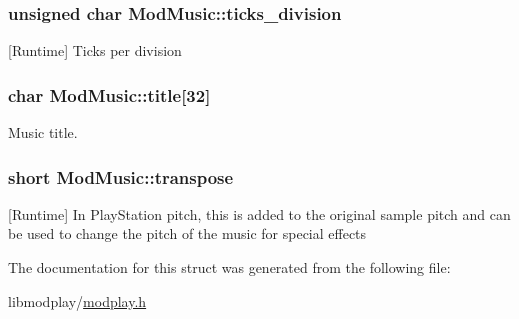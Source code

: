 \hypertarget{structModMusic_afa6eab79cc47740d4f146e2adfc16c9c}{}
\subsubsection[{ticks\+\_\+division}]{\setlength{\rightskip}{0pt plus 5cm}unsigned char Mod\+Music\+::ticks\+\_\+division}\label{structModMusic_afa6eab79cc47740d4f146e2adfc16c9c}


\mbox{[}Runtime\mbox{]} Ticks per division 

\hypertarget{structModMusic_a7b9e83bdae925b85b8603f9f92cc22f6}{}
\subsubsection[{title}]{\setlength{\rightskip}{0pt plus 5cm}char Mod\+Music\+::title\mbox{[}32\mbox{]}}\label{structModMusic_a7b9e83bdae925b85b8603f9f92cc22f6}


Music title. 

\hypertarget{structModMusic_a08eaea3acf218f237d5cfcb05870d7fc}{}
\subsubsection[{transpose}]{\setlength{\rightskip}{0pt plus 5cm}short Mod\+Music\+::transpose}\label{structModMusic_a08eaea3acf218f237d5cfcb05870d7fc}


\mbox{[}Runtime\mbox{]} In Play\+Station pitch, this is added to the original sample pitch and can be used to change the pitch of the music for special effects 



The documentation for this struct was generated from the following file\+:\begin{DoxyCompactItemize}
\item 
libmodplay/\hyperlink{modplay_8h}{modplay.\+h}\end{DoxyCompactItemize}
